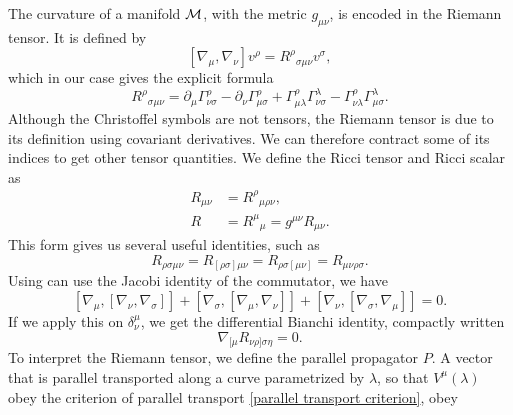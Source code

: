 The curvature of a manifold $\mathcal{M}$, with the metric $g_{\mu \nu}$, is encoded in the Riemann tensor.
It is defined by
%
\begin{equation}
    \label{Riemann tensor}
    [\nabla_\mu, \nabla_\nu] v^\rho = R^{\rho}{}_{\sigma \mu \nu} v^\sigma,
\end{equation}
%
which in our case gives the explicit formula
%
\begin{equation}
    \label{riemann tensor in terms of christoffel symbols}
    R^\rho{}_{\sigma \mu \nu} 
    = \partial_{\mu} \Gamma^{\rho}_{\nu \sigma}
    - \partial_{\nu} \Gamma^{\rho}_{\mu \sigma}
    + \Gamma^{\rho}_{\mu \lambda} \Gamma^{\lambda}_{\nu \sigma}  
    - \Gamma^{\rho}_{\nu \lambda} \Gamma^{\lambda}_{\mu \sigma}.
\end{equation}
%
Although the Christoffel symbols are not tensors, the Riemann tensor is due to its definition using covariant derivatives.
We can therefore contract some of its indices to get other tensor quantities.
We  define the Ricci tensor and Ricci scalar as
%
\begin{align}
    \label{Ricci tensor}
    R_{\mu \nu} &= R^{\rho}{}_{\mu \rho \nu}, \\
    \label{Ricci scalar}
    R &= R^{\mu}{}_{\mu} = g^{\mu \nu} R_{\mu \nu}.
\end{align}
%
This form gives us several useful identities, such as
%
\begin{equation}
    R_{\rho \sigma \mu \nu} 
    = 
    R_{[\rho \sigma] \mu \nu}
    =
    R_{\rho \sigma [\mu \nu]}
    =
    R_{\mu \nu \rho \sigma }.
\end{equation}
%
Using can use the Jacobi identity of the commutator, we have
%
\begin{equation}
    \label{Jacobi identity differential geometry}
    [\nabla_\mu, [\nabla_\nu, \nabla_\sigma]]
    + [\nabla_\sigma, [\nabla_\mu, \nabla_\nu]]
    + [\nabla_\nu, [\nabla_\sigma, \nabla_\mu]] = 0.
\end{equation}
%
If we apply this on $\delta^{\mu}_{\nu}$, we get the differential Bianchi identity, compactly written
%
\begin{equation}
    \label{Binachi identiy}
    \nabla_{[\mu}R_{\nu \rho]\sigma \eta} = 0.
\end{equation}
%
To interpret the Riemann tensor, we define the parallel propagator $P$.
A vector that is parallel transported along a curve parametrized by $\lambda$, so that $V^\mu(\lambda)$ obey the criterion of parallel transport \autoref{parallel transport criterion}, obey
